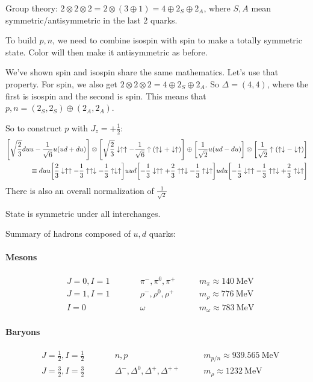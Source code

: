 Group theory: $2\otimes2\otimes2=2\otimes(3\oplus1)=4\oplus2_S\oplus2_A$, where $S,A$ mean symmetric/antisymmetric in the last 2 quarks.

To build $p,n$, we need to combine isospin with spin to make a totally symmetric state. Color will then make it antisymmetric as before.

We've shown spin and isospin share the same mathematics. Let's use that property. For spin, we also get $2\otimes2\otimes2=4\oplus2_S\oplus2_A$. So $\Delta=(4,4)$, where the first is isospin and the second is spin. This means that $p,n=(2_S,2_S)\oplus(2_A,2_A)$.

So to construct $p$ with $J_z=+\frac12$:
\begin{align*}
  \qty[\sqrt{\frac23}duu-\frac1{\sqrt{6}}u(ud+du)]\otimes
  \qty[\sqrt{\frac23}\downarrow\uparrow\uparrow-\frac1{\sqrt{6}}\uparrow(\uparrow\downarrow+\downarrow\uparrow)]\oplus
  \qty[\frac1{\sqrt{2}}u(ud-du)]\otimes
  \qty[\frac1{\sqrt{2}}\uparrow(\uparrow\downarrow-\downarrow\uparrow)]\\
  \equiv duu\qty[\frac23\downarrow\uparrow\uparrow-\frac13\uparrow\uparrow\downarrow-\frac13\uparrow\downarrow\uparrow]
  uud\qty[-\frac13\downarrow\uparrow\uparrow+\frac23\uparrow\uparrow\downarrow-\frac13\uparrow\downarrow\uparrow]
  udu\qty[-\frac13\downarrow\uparrow\uparrow-\frac13\uparrow\uparrow\downarrow+\frac23\uparrow\downarrow\uparrow]
\end{align*}
There is also an overall normalization of $\frac1{\sqrt{2}}$

State is symmetric under all interchanges.

Summary of hadrons composed of $u,d$ quarks:

\paragraph{Mesons}
\begin{align*}
  &J=0,I=1&\qquad & \pi^-,\pi^0,\pi^+   \qquad &m_\pi\approx\SI{140}{\MeV}\\
  &J=1,I=1&\qquad & \rho^-,\rho^0,\rho^+\qquad &m_\rho\approx\SI{776}{\MeV}\\
  &I=0    &\qquad & \omega              \qquad &m_\omega\approx\SI{783}{\MeV}
\end{align*}

\paragraph{Baryons}
\begin{align*}
  &J=\frac12,I=\frac12 &\qquad
  & n,p \qquad
  &m_{p/n}\approx\SI{939.565}{\MeV}\\
  &J=\frac32,I=\frac32 &\qquad
  & \Delta^-,\Delta^0,\Delta^+,\Delta^{++}\qquad
  &m_\rho\approx\SI{1232}{\MeV}
\end{align*}

